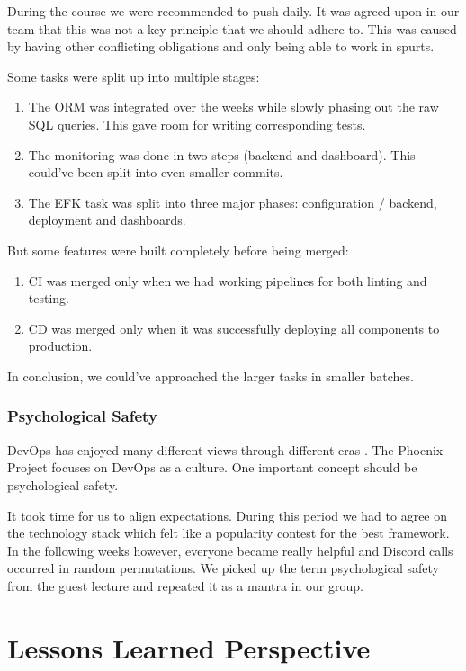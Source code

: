 \documentclass{article}
\begin{document}
During the course we were recommended to push daily. It was agreed upon in our team that this was not a key principle that we should adhere to. This was caused by having other conflicting obligations and only being able to work in spurts. 

Some tasks were split up into multiple stages:

\begin{enumerate}
    \item The ORM was integrated over the weeks while slowly phasing out the raw SQL queries. This gave room for writing corresponding tests. 
    \item The monitoring was done in two steps (backend and dashboard). This could've been split into even smaller commits. 
    \item The EFK task was split into three major phases: configuration / backend, deployment and dashboards.
\end{enumerate}

\noindent But some features were built completely before being merged:

\begin{enumerate}
    \item CI was merged only when we had working pipelines for both linting and testing.
    \item CD was merged only when it was successfully deploying all components to production.
\end{enumerate}

In conclusion, we could've approached the larger tasks in smaller batches.

\subsubsection{Psychological Safety}

DevOps has enjoyed many different views through different eras \cite{devopsviewsthrougheras}. The Phoenix Project \cite{thephoenixproject} focuses on DevOps as a culture. One important concept should be psychological safety.

It took time for us to align expectations. During this period we had to agree on the technology stack which felt like a popularity contest for the best framework. In the following weeks however, everyone became really helpful and Discord calls occurred in random permutations. We picked up the term psychological safety from the guest lecture and repeated it as a mantra in our group.

\section{Lessons Learned Perspective}
\end{document}
